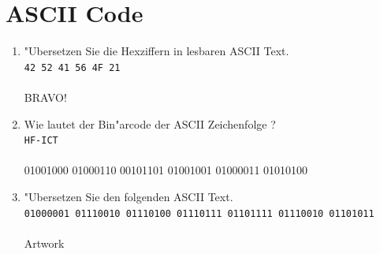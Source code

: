 \documentclass[a4paper,10pt]{article}
\begin{document}
\section{ASCII Code}

\begin{enumerate}
\item "Ubersetzen Sie die Hexziffern in lesbaren ASCII Text.\\
\verb|42 52 41 56 4F 21| \\ \\ %
	 {\color{ForestGreen}
		 BRAVO! \\
	 }

\item Wie lautet der Bin"arcode der ASCII Zeichenfolge ? \\
\verb|HF-ICT| \\ \\ %
	 {\color{ForestGreen}
		 01001000 01000110 00101101 01001001 01000011 01010100 \\
	 }

\item "Ubersetzen Sie den folgenden ASCII Text.\\
\verb|01000001 01110010 01110100 01110111 01101111 01110010 01101011| \\ \\ %
	 {\color{ForestGreen}
		 Artwork \\
	 }
\end{enumerate}
\end{document}

